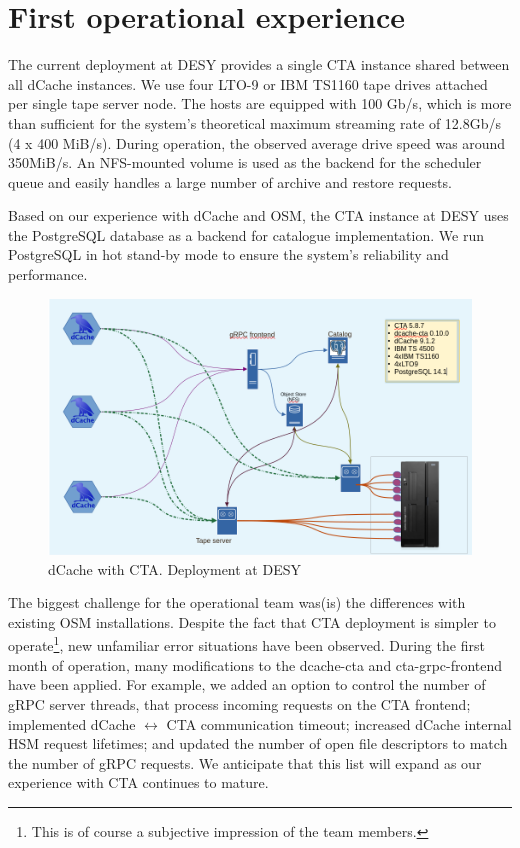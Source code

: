 \documentclass{webofc}
\begin{document}
\section{First operational experience}
\label{experence}

The current deployment at DESY provides a single CTA instance shared between all dCache instances. We use four LTO-9 or IBM TS1160 tape drives attached per single tape server node. The hosts are equipped with 100 Gb/s, which is more than sufficient for the system's theoretical maximum streaming rate of 12.8Gb/s (4 x 400 MiB/s). During operation, the observed average drive speed was around 350MiB/s.  An NFS-mounted volume is used as the backend for the scheduler queue and easily handles a large number of archive and restore requests.

Based on our experience with dCache and OSM, the CTA instance at DESY uses the PostgreSQL database\cite{postgres} as a backend for catalogue implementation. We run PostgreSQL in hot stand-by mode to ensure the system's reliability and performance.

\begin{figure}[h]
    \centering
    \includegraphics[scale=0.30 ]{cta-deployment-desy.png}
    \caption{dCache with CTA. Deployment at DESY}
    \label{fig:dcache_cta_deplyment}
\end{figure}

The biggest challenge for the operational team was(is) the differences with existing OSM installations. Despite the fact that CTA deployment is simpler to operate\footnote{This is of course a subjective impression of the team members.}, new unfamiliar error situations have been observed. During the first month of operation, many modifications to the dcache-cta and cta-grpc-frontend have been applied. For example, we added an option to control the number of gRPC server threads, that process incoming requests on the CTA frontend; implemented dCache $\leftrightarrow$ CTA communication timeout; increased dCache internal HSM request lifetimes; and updated the number of open file descriptors to match the number of gRPC requests. We anticipate that this list will expand as our experience with CTA continues to mature.
\end{document}
